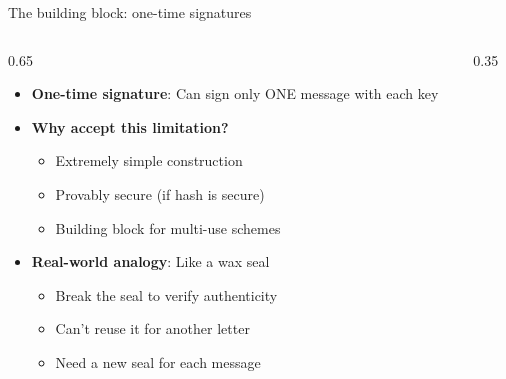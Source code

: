 \ifdefined\PRESENTATION\else\PassOptionsToClass{handout}{beamer}\fi\documentclass[aspectratio=169, lualatex]{beamer}
\begin{document}
\begin{frame}{The building block: one-time signatures}
	\begin{columns}[c]
		\begin{column}{0.65\textwidth}
			\begin{itemize}
				\item \textbf{One-time signature}: Can sign only ONE message with each key
				\item \textbf{Why accept this limitation?}
				      \begin{itemize}
					      \item Extremely simple construction
					      \item Provably secure (if hash is secure)
					      \item Building block for multi-use schemes
				      \end{itemize}
				\item \textbf{Real-world analogy}: Like a wax seal
				      \begin{itemize}
					      \item Break the seal to verify authenticity
					      \item Can't reuse it for another letter
					      \item Need a new seal for each message
				      \end{itemize}
			\end{itemize}
		\end{column}
		\begin{column}{0.35\textwidth}
		\end{column}
	\end{columns}
\end{frame}
\end{document}
